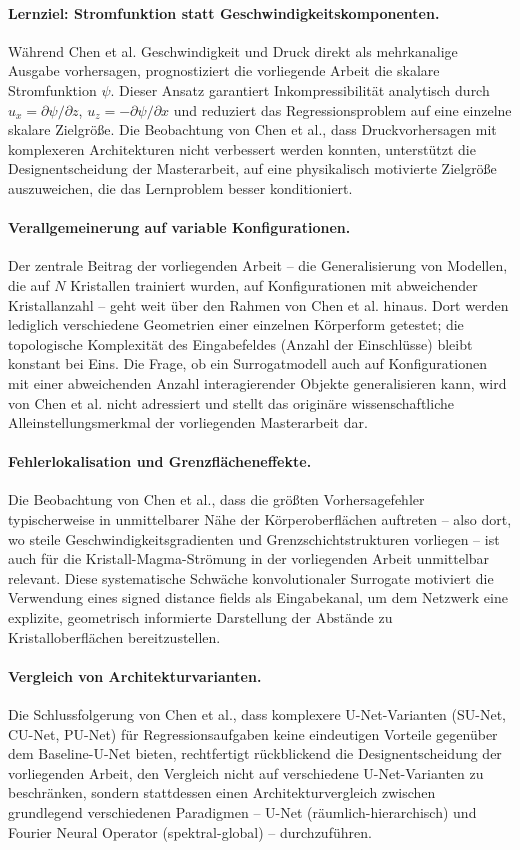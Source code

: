 \documentclass[a4paper,12pt]{article}
\begin{document}
\paragraph{Lernziel: Stromfunktion statt Geschwindigkeitskomponenten.} Während Chen et al. Geschwindigkeit und Druck direkt als mehrkanalige Ausgabe vorhersagen, prognostiziert die vorliegende Arbeit die skalare Stromfunktion $\psi$. Dieser Ansatz garantiert Inkompressibilität analytisch durch $u_x = \partial\psi/\partial z$, $u_z = -\partial\psi/\partial x$ und reduziert das Regressionsproblem auf eine einzelne skalare Zielgröße. Die Beobachtung von Chen et al., dass Druckvorhersagen mit komplexeren Architekturen nicht verbessert werden konnten, unterstützt die Designentscheidung der Masterarbeit, auf eine physikalisch motivierte Zielgröße auszuweichen, die das Lernproblem besser konditioniert.

\paragraph{Verallgemeinerung auf variable Konfigurationen.} Der zentrale Beitrag der vorliegenden Arbeit -- die Generalisierung von Modellen, die auf $N$ Kristallen trainiert wurden, auf Konfigurationen mit abweichender Kristallanzahl -- geht weit über den Rahmen von Chen et al. hinaus. Dort werden lediglich verschiedene Geometrien einer einzelnen Körperform getestet; die topologische Komplexität des Eingabefeldes (Anzahl der Einschlüsse) bleibt konstant bei Eins. Die Frage, ob ein Surrogatmodell auch auf Konfigurationen mit einer abweichenden Anzahl interagierender Objekte generalisieren kann, wird von Chen et al. nicht adressiert und stellt das originäre wissenschaftliche Alleinstellungsmerkmal der vorliegenden Masterarbeit dar.

\paragraph{Fehlerlokalisation und Grenzflächeneffekte.} Die Beobachtung von Chen et al., dass die größten Vorhersagefehler typischerweise in unmittelbarer Nähe der Körperoberflächen auftreten -- also dort, wo steile Geschwindigkeitsgradienten und Grenzschichtstrukturen vorliegen -- ist auch für die Kristall-Magma-Strömung in der vorliegenden Arbeit unmittelbar relevant. Diese systematische Schwäche konvolutionaler Surrogate motiviert die Verwendung eines signed distance fields als Eingabekanal, um dem Netzwerk eine explizite, geometrisch informierte Darstellung der Abstände zu Kristalloberflächen bereitzustellen.

\paragraph{Vergleich von Architekturvarianten.} Die Schlussfolgerung von Chen et al., dass komplexere U-Net-Varianten (SU-Net, CU-Net, PU-Net) für Regressionsaufgaben keine eindeutigen Vorteile gegenüber dem Baseline-U-Net bieten, rechtfertigt rückblickend die Designentscheidung der vorliegenden Arbeit, den Vergleich nicht auf verschiedene U-Net-Varianten zu beschränken, sondern stattdessen einen Architekturvergleich zwischen grundlegend verschiedenen Paradigmen -- U-Net (räumlich-hierarchisch) und Fourier Neural Operator (spektral-global) -- durchzuführen.
\end{document}
